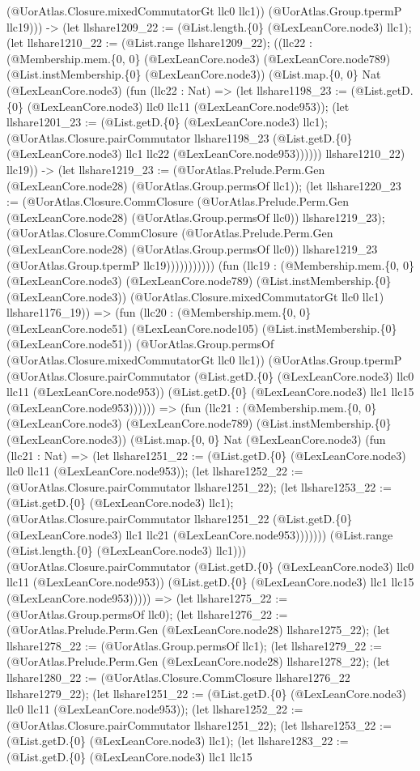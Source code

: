 \documentclass[11pt]{article}
\begin{document}
(@UorAtlas.Closure.mixedCommutatorGt llc0 llc1)) (@UorAtlas.Group.tpermP llc19))) -> (let llshare1209\_22 := (@List.length.\{0\} (@LexLeanCore.node3) llc1); (let llshare1210\_22 := (@List.range llshare1209\_22); ((llc22 : (@Membership.mem.\{0, 0\} (@LexLeanCore.node3) (@LexLeanCore.node789) (@List.instMembership.\{0\} (@LexLeanCore.node3)) (@List.map.\{0, 0\} Nat (@LexLeanCore.node3) (fun (llc22 : Nat) => (let llshare1198\_23 := (@List.getD.\{0\} (@LexLeanCore.node3) llc0 llc11 (@LexLeanCore.node953)); (let llshare1201\_23 := (@List.getD.\{0\} (@LexLeanCore.node3) llc1); (@UorAtlas.Closure.pairCommutator llshare1198\_23 (@List.getD.\{0\} (@LexLeanCore.node3) llc1 llc22 (@LexLeanCore.node953)))))) llshare1210\_22) llc19)) -> (let llshare1219\_23 := (@UorAtlas.Prelude.Perm.Gen (@LexLeanCore.node28) (@UorAtlas.Group.permsOf llc1)); (let llshare1220\_23 := (@UorAtlas.Closure.CommClosure (@UorAtlas.Prelude.Perm.Gen (@LexLeanCore.node28) (@UorAtlas.Group.permsOf llc0)) llshare1219\_23); (@UorAtlas.Closure.CommClosure (@UorAtlas.Prelude.Perm.Gen (@LexLeanCore.node28) (@UorAtlas.Group.permsOf llc0)) llshare1219\_23 (@UorAtlas.Group.tpermP llc19))))))))))) (fun (llc19 : (@Membership.mem.\{0, 0\} (@LexLeanCore.node3) (@LexLeanCore.node789) (@List.instMembership.\{0\} (@LexLeanCore.node3)) (@UorAtlas.Closure.mixedCommutatorGt llc0 llc1) llshare1176\_19)) => (fun (llc20 : (@Membership.mem.\{0, 0\} (@LexLeanCore.node51) (@LexLeanCore.node105) (@List.instMembership.\{0\} (@LexLeanCore.node51)) (@UorAtlas.Group.permsOf (@UorAtlas.Closure.mixedCommutatorGt llc0 llc1)) (@UorAtlas.Group.tpermP (@UorAtlas.Closure.pairCommutator (@List.getD.\{0\} (@LexLeanCore.node3) llc0 llc11 (@LexLeanCore.node953)) (@List.getD.\{0\} (@LexLeanCore.node3) llc1 llc15 (@LexLeanCore.node953)))))) => (fun (llc21 : (@Membership.mem.\{0, 0\} (@LexLeanCore.node3) (@LexLeanCore.node789) (@List.instMembership.\{0\} (@LexLeanCore.node3)) (@List.map.\{0, 0\} Nat (@LexLeanCore.node3) (fun (llc21 : Nat) => (let llshare1251\_22 := (@List.getD.\{0\} (@LexLeanCore.node3) llc0 llc11 (@LexLeanCore.node953)); (let llshare1252\_22 := (@UorAtlas.Closure.pairCommutator llshare1251\_22); (let llshare1253\_22 := (@List.getD.\{0\} (@LexLeanCore.node3) llc1); (@UorAtlas.Closure.pairCommutator llshare1251\_22 (@List.getD.\{0\} (@LexLeanCore.node3) llc1 llc21 (@LexLeanCore.node953))))))) (@List.range (@List.length.\{0\} (@LexLeanCore.node3) llc1))) (@UorAtlas.Closure.pairCommutator (@List.getD.\{0\} (@LexLeanCore.node3) llc0 llc11 (@LexLeanCore.node953)) (@List.getD.\{0\} (@LexLeanCore.node3) llc1 llc15 (@LexLeanCore.node953))))) => (let llshare1275\_22 := (@UorAtlas.Group.permsOf llc0); (let llshare1276\_22 := (@UorAtlas.Prelude.Perm.Gen (@LexLeanCore.node28) llshare1275\_22); (let llshare1278\_22 := (@UorAtlas.Group.permsOf llc1); (let llshare1279\_22 := (@UorAtlas.Prelude.Perm.Gen (@LexLeanCore.node28) llshare1278\_22); (let llshare1280\_22 := (@UorAtlas.Closure.CommClosure llshare1276\_22 llshare1279\_22); (let llshare1251\_22 := (@List.getD.\{0\} (@LexLeanCore.node3) llc0 llc11 (@LexLeanCore.node953)); (let llshare1252\_22 := (@UorAtlas.Closure.pairCommutator llshare1251\_22); (let llshare1253\_22 := (@List.getD.\{0\} (@LexLeanCore.node3) llc1); (let llshare1283\_22 := (@List.getD.\{0\} (@LexLeanCore.node3) llc1 llc15 
\end{document}

